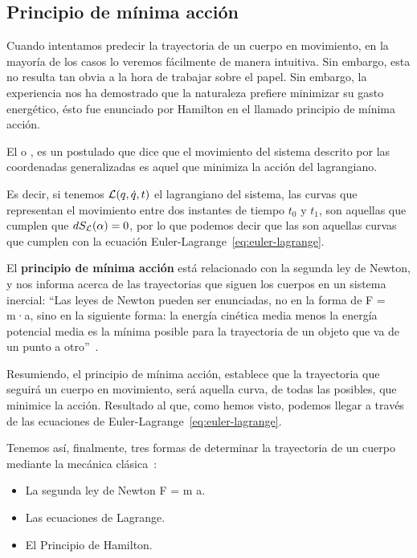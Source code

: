 \subsection{Principio de mínima acción}\label{subsec:principio-de-mínima-acción}

Cuando intentamos predecir la trayectoria de un cuerpo en movimiento, en la mayoría de los casos lo veremos fácilmente de manera intuitiva. Sin embargo, esta no resulta tan obvia a la hora de trabajar sobre el papel. Sin embargo, la experiencia nos ha demostrado que la naturaleza prefiere minimizar su gasto energético, ésto fue enunciado por Hamilton en el llamado principio de mínima acción.

El  o , es un postulado que dice que el movimiento del sistema descrito por las coordenadas generalizadas es aquel que minimiza la acción del lagrangiano\label{po:pma}.

Es decir, si tenemos $\mathcal{L}(q,\dot{q}, t)$ el lagrangiano del sistema, las curvas que representan el movimiento entre dos instantes de tiempo $t_0$ y $t_1$, son aquellas que cumplen que $dS_{\mathcal{L}}(\alpha)=0$, por lo que podemos decir que las  son aquellas curvas que cumplen con la ecuación Euler-Lagrange~\eqref{eq:euler-lagrange}.

El \textbf{principio de mínima acción} está relacionado con la segunda ley de Newton, y nos informa acerca de las trayectorias que siguen los cuerpos en un sistema inercial:
``Las leyes de Newton pueden ser enunciadas, no en la forma de F = m·a, sino en la siguiente forma: la energía cinética media menos la energía potencial media es la mínima posible para la trayectoria de un objeto que va de un punto a otro''~\cite{Feynman}.

Resumiendo, el principio de mínima acción, establece que la trayectoria que seguirá un cuerpo en movimiento, será aquella curva, de todas las posibles, que minimice la acción. Resultado al que, como hemos visto, podemos llegar a través de las ecuaciones de Euler-Lagrange~\eqref{eq:euler-lagrange}.

Tenemos así, finalmente, tres formas de determinar la trayectoria de un cuerpo mediante la mecánica clásica~\autocite[264]{Taylor}:
\begin{itemize}
    \item La segunda ley de Newton F = m \cdot a.
    \item Las ecuaciones de Lagrange.
    \item El Principio de Hamilton.
\end{itemize}